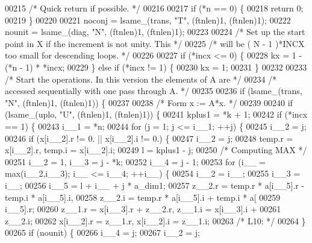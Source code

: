 \begin{DoxyCode}
00215 \textcolor{comment}{/*     Quick return if possible. */}
00216 
00217     \textcolor{keywordflow}{if} (*n == 0) \{
00218     \textcolor{keywordflow}{return} 0;
00219     \}
00220 
00221     noconj = lsame\_(trans, \textcolor{stringliteral}{"T"}, (ftnlen)1, (ftnlen)1);
00222     nounit = lsame\_(diag, \textcolor{stringliteral}{"N"}, (ftnlen)1, (ftnlen)1);
00223 
00224 \textcolor{comment}{/*     Set up the start point in X if the increment is not unity. This */}
00225 \textcolor{comment}{/*     will be  ( N - 1 )*INCX   too small for descending loops. */}
00226 
00227     \textcolor{keywordflow}{if} (*incx <= 0) \{
00228     kx = 1 - (*n - 1) * *incx;
00229     \} \textcolor{keywordflow}{else} \textcolor{keywordflow}{if} (*incx != 1) \{
00230     kx = 1;
00231     \}
00232 
00233 \textcolor{comment}{/*     Start the operations. In this version the elements of A are */}
00234 \textcolor{comment}{/*     accessed sequentially with one pass through A. */}
00235 
00236     \textcolor{keywordflow}{if} (lsame\_(trans, \textcolor{stringliteral}{"N"}, (ftnlen)1, (ftnlen)1)) \{
00237 
00238 \textcolor{comment}{/*         Form  x := A*x. */}
00239 
00240     \textcolor{keywordflow}{if} (lsame\_(uplo, \textcolor{stringliteral}{"U"}, (ftnlen)1, (ftnlen)1)) \{
00241         kplus1 = *k + 1;
00242         \textcolor{keywordflow}{if} (*incx == 1) \{
00243         i\_\_1 = *n;
00244         \textcolor{keywordflow}{for} (j = 1; j <= i\_\_1; ++j) \{
00245             i\_\_2 = j;
00246             \textcolor{keywordflow}{if} (x[i\_\_2].r != 0. || x[i\_\_2].i != 0.) \{
00247             i\_\_2 = j;
00248             temp.r = x[i\_\_2].r, temp.i = x[i\_\_2].i;
00249             l = kplus1 - j;
00250 \textcolor{comment}{/* Computing MAX */}
00251             i\_\_2 = 1, i\_\_3 = j - *k;
00252             i\_\_4 = j - 1;
00253             \textcolor{keywordflow}{for} (i\_\_ = max(i\_\_2,i\_\_3); i\_\_ <= i\_\_4; ++i\_\_) \{
00254                 i\_\_2 = i\_\_;
00255                 i\_\_3 = i\_\_;
00256                 i\_\_5 = l + i\_\_ + j * a\_dim1;
00257                 z\_\_2.r = temp.r * a[i\_\_5].r - temp.i * a[i\_\_5].i, 
00258                     z\_\_2.i = temp.r * a[i\_\_5].i + temp.i * a[
00259                     i\_\_5].r;
00260                 z\_\_1.r = x[i\_\_3].r + z\_\_2.r, z\_\_1.i = x[i\_\_3].i + 
00261                     z\_\_2.i;
00262                 x[i\_\_2].r = z\_\_1.r, x[i\_\_2].i = z\_\_1.i;
00263 \textcolor{comment}{/* L10: */}
00264             \}
00265             \textcolor{keywordflow}{if} (nounit) \{
00266                 i\_\_4 = j;
00267                 i\_\_2 = j;

\end{DoxyCode}

